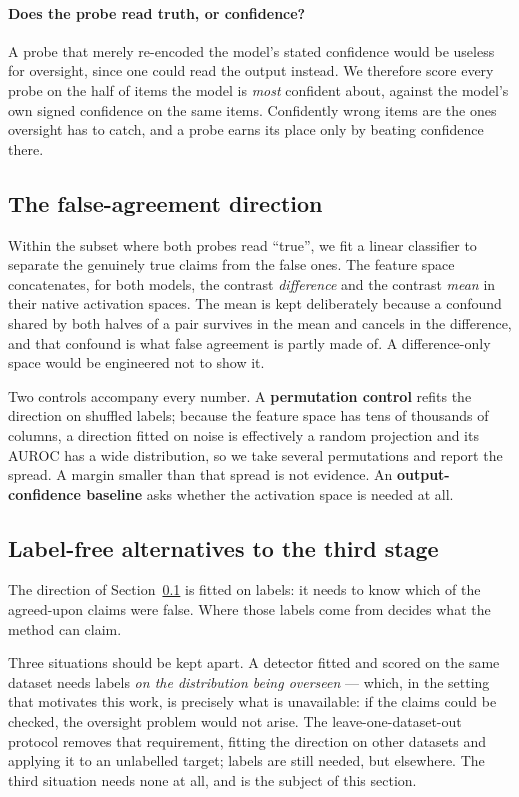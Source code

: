 \paragraph{Does the probe read truth, or confidence?}
A probe that merely re-encoded the model's stated confidence would be useless for
oversight, since one could read the output instead. We therefore score every
probe on the half of items the model is \emph{most} confident about, against the
model's own signed confidence on the same items. Confidently wrong items are the
ones oversight has to catch, and a probe earns its place only by beating
confidence there.

\subsection{The false-agreement direction}
\label{sec:method:direction}

Within the subset where both probes read ``true'', we fit a linear classifier to
separate the genuinely true claims from the false ones. The feature space
concatenates, for both models, the contrast \emph{difference} and the contrast
\emph{mean} in their native activation spaces. The mean is kept deliberately
because a confound shared by both halves of a pair survives in the mean and
cancels in the difference, and that confound is what false agreement is partly
made of. A difference-only space would be engineered not to show it.

Two controls accompany every number. A \textbf{permutation control} refits the
direction on shuffled labels; because the feature space has tens of thousands of
columns, a direction fitted on noise is effectively a random projection and its
AUROC has a wide distribution, so we take several permutations and report the
spread. A margin smaller than that spread is not evidence. An
\textbf{output-confidence baseline} asks whether the activation space is needed
at all.

\subsection{Label-free alternatives to the third stage}
\label{sec:method:unsup}

The direction of Section~\ref{sec:method:direction} is fitted on labels: it needs
to know which of the agreed-upon claims were false. Where those labels come from
decides what the method can claim.

Three situations should be kept apart. A detector fitted and scored on the same
dataset needs labels \emph{on the distribution being overseen} --- which, in the
setting that motivates this work, is precisely what is unavailable: if the claims
could be checked, the oversight problem would not arise. The
leave-one-dataset-out protocol removes that requirement, fitting the direction on
other datasets and applying it to an unlabelled target; labels are still needed,
but elsewhere. The third situation needs none at all, and is the subject of this
section.

